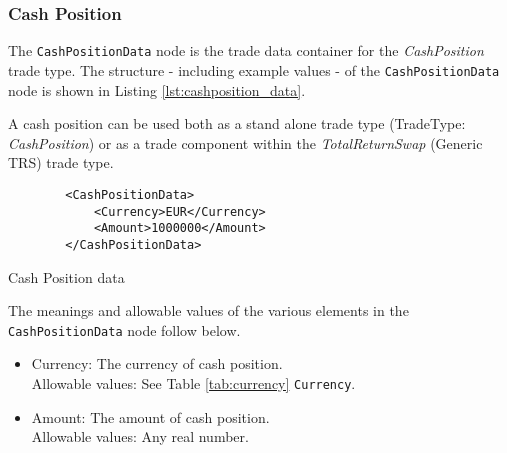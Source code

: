 \subsubsection{Cash Position}
\label{ss:cash_position}

The \lstinline!CashPositionData!  node is the trade data container for the \emph{CashPosition} trade type.  The structure -
including example values - of the \lstinline!CashPositionData!  node is shown in Listing \ref{lst:cashposition_data}.

A cash position can be used both as a stand alone trade type (TradeType: \emph{CashPosition}) or as a trade component within the \emph{TotalReturnSwap} (Generic TRS) trade type.

\begin{listing}[H]
\begin{verbatim}
        <CashPositionData>
            <Currency>EUR</Currency>
            <Amount>1000000</Amount>
        </CashPositionData>
\end{verbatim}
\caption{Cash Position data}
\label{lst:cashposition_data}
\end{listing}

The meanings and allowable values of the various elements in the \lstinline!CashPositionData!  node follow below.

\begin{itemize}
\item Currency: The currency of cash position.  \\ Allowable values:  See Table \ref{tab:currency}  \lstinline!Currency!.
\item Amount: The amount of cash position.  \\ Allowable values:  Any real number.
\end{itemize}

